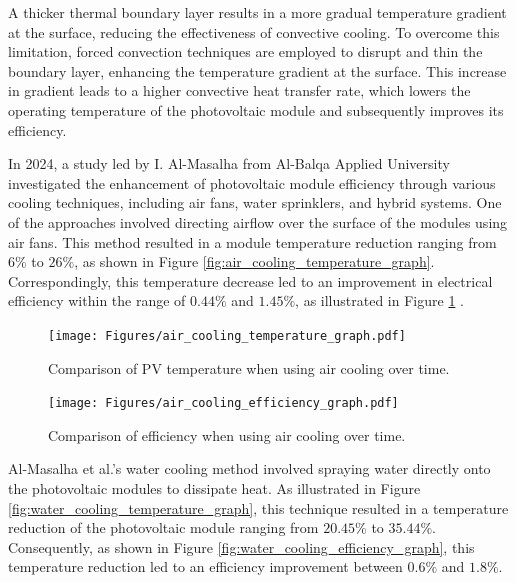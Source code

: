A thicker thermal boundary layer results in a more gradual temperature gradient at the surface, reducing the effectiveness of convective cooling. To overcome this limitation, forced convection techniques are employed to disrupt and thin the boundary layer, enhancing the temperature gradient at the surface. This increase in gradient leads to a higher convective heat transfer rate, which lowers the operating temperature of the photovoltaic module and subsequently improves its efficiency.\vspace{0.5em}

In 2024, a study led by I. Al-Masalha from Al-Balqa Applied University investigated the enhancement of photovoltaic module efficiency through various cooling techniques, including air fans, water sprinklers, and hybrid systems. One of the approaches involved directing airflow over the surface of the modules using air fans. This method resulted in a module temperature reduction ranging from $6\%$ to $26\%$, as shown in Figure \ref{fig:air_cooling_temperature_graph}. Correspondingly, this temperature decrease led to an improvement in electrical efficiency within the range of $0.44\%$ and $1.45\%$, as illustrated in Figure \ref{fig:air_cooling_efficiency_graph} \cite{Al-Masalha2024ImprovingSystems}.

\begin{figure}[ht]
    \centering
    \begin{minipage}[b]{0.45\linewidth}
        \centering
        \texttt{[image: Figures/air\_cooling\_temperature\_graph.pdf]}
        \caption{Comparison of PV temperature when using air cooling over time. \cite{Al-Masalha2024ImprovingSystems}}
        \label{fig:air_cooling_temperature_graph}
    \end{minipage}
    \hfill
    \begin{minipage}[b]{0.45\linewidth}
        \centering
        \texttt{[image: Figures/air\_cooling\_efficiency\_graph.pdf]}
        \caption{Comparison of efficiency when using air cooling over time. \cite{Al-Masalha2024ImprovingSystems}}
        \label{fig:air_cooling_efficiency_graph}
    \end{minipage}
\end{figure}

Al-Masalha et al.'s water cooling method involved spraying water directly onto the photovoltaic modules to dissipate heat. As illustrated in Figure \ref{fig:water_cooling_temperature_graph}, this technique resulted in a temperature reduction of the photovoltaic module ranging from $20.45\%$ to $35.44\%$. Consequently, as shown in Figure \ref{fig:water_cooling_efficiency_graph}, this temperature reduction led to an efficiency improvement between $0.6\%$ and $1.8\%$. \cite{Al-Masalha2024ImprovingSystems}

